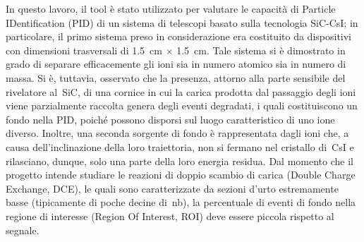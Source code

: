 In questo lavoro, il tool è stato utilizzato per valutare le capacità di Particle IDentification (PID) di un sistema di telescopi basato sulla tecnologia SiC-CsI; in particolare, il primo sistema preso in considerazione era costituito da dispositivi con dimensioni trasversali di 1.5~cm $\times$ 1.5~cm.
Tale sistema si è dimostrato in grado di separare efficacemente gli ioni sia in numero atomico sia in numero di massa.
Si è, tuttavia, osservato che la presenza, attorno alla parte sensibile del rivelatore al~SiC, di una cornice in cui la carica prodotta dal passaggio degli ioni viene parzialmente raccolta genera degli eventi degradati, i quali costituiscono un fondo nella PID, poiché possono disporsi sul luogo caratteristico di uno ione diverso.
Inoltre, una seconda sorgente di fondo è rappresentata dagli ioni che, a causa dell'inclinazione della loro traiettoria, non si fermano nel cristallo di~CsI e rilasciano, dunque, solo una parte della loro energia residua.
Dal momento che il progetto intende studiare le reazioni di doppio scambio di carica (Double Charge Exchange, DCE), le quali sono caratterizzate da sezioni d'urto estremamente basse (tipicamente di poche decine di~nb), la percentuale di eventi di fondo nella regione di interesse (Region Of Interest, ROI) deve essere piccola rispetto al segnale.
